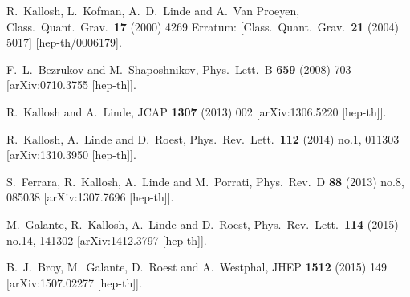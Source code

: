 \begin{thebibliography}{10}
  R.~Kallosh, L.~Kofman, A.~D.~Linde and A.~Van Proeyen,
  Class.\ Quant.\ Grav.\  {\bf 17} (2000) 4269
   Erratum: [Class.\ Quant.\ Grav.\  {\bf 21} (2004) 5017]
  [hep-th/0006179].


  F.~L.~Bezrukov and M.~Shaposhnikov,
  Phys.\ Lett.\ B {\bf 659} (2008) 703
  [arXiv:0710.3755 [hep-th]].


  R.~Kallosh and A.~Linde,
  JCAP {\bf 1307} (2013) 002
  [arXiv:1306.5220 [hep-th]].


  R.~Kallosh, A.~Linde and D.~Roest,
  Phys.\ Rev.\ Lett.\  {\bf 112} (2014) no.1,  011303
  [arXiv:1310.3950 [hep-th]].


  S.~Ferrara, R.~Kallosh, A.~Linde and M.~Porrati,
  Phys.\ Rev.\ D {\bf 88} (2013) no.8,  085038
  [arXiv:1307.7696 [hep-th]].


  M.~Galante, R.~Kallosh, A.~Linde and D.~Roest,
  Phys.\ Rev.\ Lett.\  {\bf 114} (2015) no.14,  141302
  [arXiv:1412.3797 [hep-th]].


  B.~J.~Broy, M.~Galante, D.~Roest and A.~Westphal,
  JHEP {\bf 1512} (2015) 149
  [arXiv:1507.02277 [hep-th]].



\end{thebibliography}
